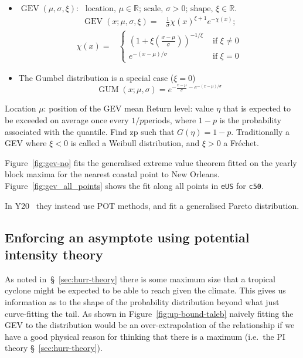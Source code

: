 





\begin{itemize}
\item
\(
\operatorname{GEV}(\mu, \sigma, \xi):
\)
\(
\text{ location, } \mu \in \mathbb{R}
\text{; scale, } \sigma>0
\text{; shape, } \xi \in \mathbb{R}.
\)
\begin{eqnarray}
\operatorname{GEV}(x; \mu, \sigma, \xi)=&
\frac{1}{\sigma} \chi(x)^{\xi+1} e^{-\chi(x)};
\end{eqnarray}
\begin{eqnarray}
\chi(x)=&\left\{\begin{array}{ll}
\left(1+\xi\left(\frac{x-\mu}{\sigma}\right)\right)^{-1 / \xi} & \text { if } \xi \neq 0 \\
e^{-(x-\mu) / \sigma} & \text { if } \xi=0
\end{array}\right.
\end{eqnarray}
\item The Gumbel distribution is a special case ($\xi=0$)
\begin{equation}
\operatorname{GUM}(x ; \mu, \sigma)=e^{-\frac{x-\mu}{\sigma}-e^{-(x-\mu) / \sigma}}
\end{equation}
\end{itemize}

Location $\mu$: position of the GEV mean
Return level: value $\eta$ that is expected to
be exceeded on average once every $1/p $periods,
where $1 − p$ is the probability associated with the quantile.
Find zp such that
$G(\eta) = 1 − p$.
Traditionally a GEV where
$\xi<0$ is called a Weibull
distribution, and  $\xi>0$ a Fr\'echet.

Figure~\ref{fig:gev-no} fits the generalised extreme value theorem fitted
on the yearly block maxima for the nearest coastal point to New Orleans.
Figure~\ref{fig:gev_all_points} shows the fit along all points in \texttt{eUS}
for \texttt{c50}.

In Y20~\cite{ZannaPreprint} they instead use POT methods,
and fit a generalised Pareto distribution.

\subsection{Enforcing an asymptote using potential intensity theory }
As noted in~§~\ref{sec:hurr-theory} there is some maximum size
that a tropical cyclone might be expected to be able to reach given
the climate. This gives us information as to the shape of the probability
distribution beyond what just curve-fitting the tail.
As shown in Figure~\ref{fig:up-bound-taleb} naively fitting
the GEV to the distribution would be an over-extrapolation of
the relationship if we have a good physical reason for
thinking that there is a maximum
(i.e.~the PI theory §~\ref{sec:hurr-theory}).


